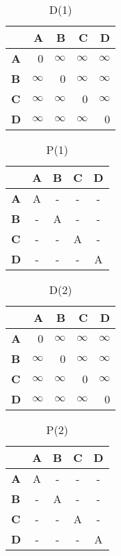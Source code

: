 \documentclass{article}
\newcommand{\INF}{$\infty$}
\begin{document}
\begin{table}[H]\centering
\caption{D(1)}
\begin{tabular}{l r r r r}
\toprule
 & \textbf{A} & \textbf{B} & \textbf{C} & \textbf{D}\\\midrule
\textbf{A} & 0 & \INF & \INF & \INF \\
\textbf{B} & \INF & 0 & \INF & \INF \\
\textbf{C} & \INF & \INF & 0 & \INF \\
\textbf{D} & \INF & \INF & \INF & 0 \\
\bottomrule
\end{tabular}
\end{table}

\begin{table}[H]\centering
\caption{P(1)}
\begin{tabular}{l c c c c}
\toprule
 & \textbf{A} & \textbf{B} & \textbf{C} & \textbf{D}\\\midrule
\textbf{A} & \cellcolor{yellow!30}A & - & - & - \\
\textbf{B} & - & \cellcolor{yellow!30}A & - & - \\
\textbf{C} & - & - & \cellcolor{yellow!30}A & - \\
\textbf{D} & - & - & - & \cellcolor{yellow!30}A \\
\bottomrule
\end{tabular}
\end{table}

\begin{table}[H]\centering
\caption{D(2)}
\begin{tabular}{l r r r r}
\toprule
 & \textbf{A} & \textbf{B} & \textbf{C} & \textbf{D}\\\midrule
\textbf{A} & 0 & \INF & \INF & \INF \\
\textbf{B} & \INF & 0 & \INF & \INF \\
\textbf{C} & \INF & \INF & 0 & \INF \\
\textbf{D} & \INF & \INF & \INF & 0 \\
\bottomrule
\end{tabular}
\end{table}

\begin{table}[H]\centering
\caption{P(2)}
\begin{tabular}{l c c c c}
\toprule
 & \textbf{A} & \textbf{B} & \textbf{C} & \textbf{D}\\\midrule
\textbf{A} & A & - & - & - \\
\textbf{B} & - & A & - & - \\
\textbf{C} & - & - & A & - \\
\textbf{D} & - & - & - & A \\
\bottomrule
\end{tabular}
\end{table}
\end{document}
